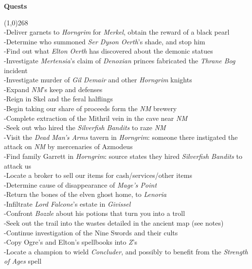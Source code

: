 \documentclass[letterpaper]{article}
\newcommand{\colline}{\line(1,0){268} \\}
\newcommand{\e}[1]{\emph{#1}}
\newcommand{\B}[1]{\textbf{#1}}
\newenvironment{notesection}[1]
{ {\huge \B{#1}} \par
\vspace{-0.75em}
\colline
\begingroup\fontsize{9pt}{12pt}\selectfont}
{\endgroup}
\begin{document}
\begin{notesection}{Quests}
-Deliver garnets to \e{Horngrim} for \e{Merkel}, obtain the reward of a black pearl\\
-Determine who summoned \e{Ser Dyson Oerth}'s shade, and stop him\\
-Find out what \e{Elton Oerth} has discovered about the demonic statues\\
-Investigate \e{Mertensia}'s claim of \e{Denoxian} princes fabricated the \e{Thrane Bog} incident\\
-Investigate murder of \e{Gil Demair} and other \e{Horngrim} knights\\

-Expand \e{NM}'s keep and defenses\\
-Reign in Skel and the feral halflings\\
-Begin taking our share of proceeds form the \e{NM} brewery\\
-Complete extraction of the Mithril vein in the cave near \e{NM}\\
-Seek out who hired the \e{Silverfish Bandits} to raze \e{NM}\\
-Visit the \e{Dead Man's Arms} tavern in \e{Horngrim}: someone there instigated the attack on \e{NM} by mercenaries of Azmodeus\\
-Find family Garrett in \e{Horngrim}: source states they hired \e{Silverfish Bandits} to attack us\\
-Locate a broker to sell our items for cash/services/other items\\

-Determine cause of disappearance of \e{Mage's Point}\\
-Return the bones of the elven ghost home, to \e{Lenoria}\\
-Infiltrate \e{Lord Falcone}'s estate in \e{Givissel}\\

-Confront \e{Bozzle} about his potions that turn you into a troll\\
-Seek out the trail into the wastes detailed in the ancient map (see notes)\\
-Continue investigation of the Nine Swords and their cults\\

-Copy Ogre's and Elton's spellbooks into \e{Z}'s\\
-Locate a champion to wield \e{Concluder}, and possibly to benefit from the \e{Strength of Ages} spell\\
\end{notesection}
\end{document}
